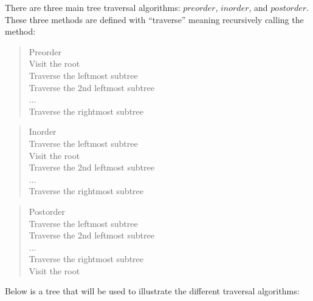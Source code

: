 \documentclass[12pt]{article}
\newenvironment{problem}[2][Problem]{\begin{trivlist}
\item[\hskip \labelsep {\bfseries #1}\hskip \labelsep {\bfseries #2.}]}{\end{trivlist}}
\begin{document}
\begin{problem}{1} %
There are three main tree traversal algorithms: $preorder$, $inorder$, and $postorder$.\\
These three methods are defined with ``traverse'' meaning recursively calling the method:
\begin{quote}
  Preorder\\
  Visit the root\\
  Traverse the leftmost subtree\\
  Traverse the 2nd leftmost subtree\\
  ...\\
  Traverse the rightmost subtree
\end{quote}

\begin{quote}
  Inorder\\
  Traverse the leftmost subtree\\
  Visit the root\\
  Traverse the 2nd leftmost subtree\\
  ...\\
  Traverse the rightmost subtree
\end{quote}

\begin{quote}
  Postorder\\
  Traverse the leftmost subtree\\
  Traverse the 2nd leftmost subtree\\
  ...\\
  Traverse the rightmost subtree\\
  Visit the root
\end{quote}

\pagebreak
Below is a tree that will be used to illustrate the different traversal algorithms:\\

\end{problem}
\end{document}

